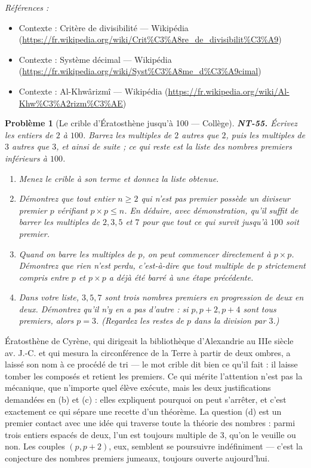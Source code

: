 \documentclass[11pt]{article}
\newtheorem{problem}{Problème}
\newenvironment{refs}{\par\small\noindent\emph{Références :}\begin{itemize}\setlength\itemsep{0pt}}{\end{itemize}\normalsize}
\begin{document}
\begin{refs}
\item Contexte : Critère de divisibilité --- Wikipédia (\url{https://fr.wikipedia.org/wiki/Crit%C3%A8re_de_divisibilit%C3%A9})
\item Contexte : Système décimal --- Wikipédia (\url{https://fr.wikipedia.org/wiki/Syst%C3%A8me_d%C3%A9cimal})
\item Contexte : Al-Khwârizmî --- Wikipédia (\url{https://fr.wikipedia.org/wiki/Al-Khw%C3%A2rizm%C3%AE})
\end{refs}

\bigskip

\begin{problem}[{Le crible d'Ératosthène jusqu'à 100 --- Collège}]
\textbf{NT-55.} Écrivez les entiers de $ 2 $ à $ 100 $. Barrez les multiples de $ 2 $ autres
que $ 2 $, puis les multiples de $ 3 $ autres que $ 3 $, et ainsi de suite ; ce qui reste est la
liste des nombres premiers inférieurs à $ 100 $.
\begin{enumerate}
\item[(a)] Menez le crible à son terme et donnez la liste obtenue.
\item[(b)] Démontrez que tout entier $ n \ge 2 $ qui n'est pas premier possède un diviseur premier
$ p $ vérifiant $ p \times p \le n $. En déduire, avec démonstration, qu'il suffit de barrer les
multiples de $ 2, 3, 5 $ et $ 7 $ pour que tout ce qui survit jusqu'à $ 100 $ soit premier.
\item[(c)] Quand on barre les multiples de $ p $, on peut commencer directement à $ p \times p $.
Démontrez que rien n'est perdu, c'est-à-dire que tout multiple de $ p $ strictement compris entre
$ p $ et $ p \times p $ a déjà été barré à une étape précédente.
\item[(d)] Dans votre liste, $ 3, 5, 7 $ sont trois nombres premiers en progression de deux en deux.
Démontrez qu'il n'y en a pas d'autre : si $ p, p+2, p+4 $ sont tous premiers, alors $ p = 3 $.
(Regardez les restes de $ p $ dans la division par $ 3 $.)
\end{enumerate}

\end{problem}

\noindent Ératosthène de Cyrène, qui dirigeait la bibliothèque d'Alexandrie au
IIIe siècle av. J.-C. et qui mesura la circonférence de la Terre à partir de deux ombres,
a laissé son nom à ce procédé de tri --- le mot \og{} crible \fg{} dit bien ce qu'il fait : il laisse tomber les
composés et retient les premiers. Ce qui mérite l'attention n'est pas la mécanique, que n'importe
quel élève exécute, mais les deux justifications demandées en (b) et (c) : elles expliquent pourquoi
on peut s'arrêter, et c'est exactement ce qui sépare une recette d'un théorème. La question (d) est un
premier contact avec une idée qui traverse toute la théorie des nombres : parmi trois entiers espacés
de deux, l'un est toujours multiple de $ 3 $, qu'on le veuille ou non. Les couples $ (p, p+2) $,
eux, semblent se poursuivre indéfiniment --- c'est la conjecture des nombres premiers jumeaux, toujours
ouverte aujourd'hui.
\end{document}
